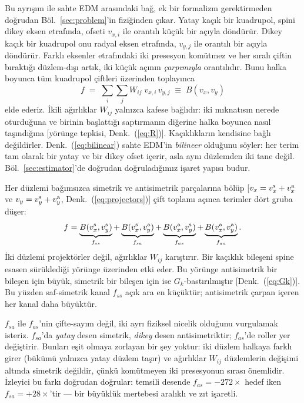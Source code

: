\documentclass[aps,prab,reprint,superscriptaddress,nofootinbib]{revtex4-2}
\begin{document}
Bu ayrışım ile sahte EDM arasındaki bağ, ek bir formalizm gerektirmeden doğrudan
Böl.~\ref{sec:problem}'in fiziğinden çıkar. Yatay kaçık bir kuadrupol, spini dikey
eksen etrafında, ofseti $v_{x,i}$ ile orantılı küçük bir açıyla döndürür. Dikey
kaçık bir kuadrupol onu radyal eksen etrafında, $v_{y,j}$ ile orantılı bir açıyla
döndürür. Farklı eksenler etrafındaki iki presesyon komütmez ve her sıralı çiftin
bıraktığı düzlem-dışı artık, iki küçük açının \emph{çarpımıyla} orantılıdır. Bunu
halka boyunca tüm kuadrupol çiftleri üzerinden toplayınca
\begin{equation}
  f \;=\; \sum_{i}\sum_{j} W_{ij}\; v_{x,i}\, v_{y,j}
  \;\equiv\; B(v_x, v_y)
  \label{eq:bilinear}
\end{equation}
elde ederiz. İkili ağırlıklar $W_{ij}$ yalnızca kafese bağlıdır: iki mıknatısın
nerede oturduğuna ve birinin başlattığı saptırmanın diğerine halka boyunca nasıl
taşındığına [yörünge tepkisi, Denk.~(\ref{eq:R})]. Kaçıklıkların kendisine
bağlı değildirler. Denk.~(\ref{eq:bilinear}) sahte EDM'in \emph{bilineer} olduğunu
söyler: her terim tam olarak bir yatay ve bir dikey ofset içerir, asla aynı
düzlemden iki tane değil. Böl.~\ref{sec:estimator}'de doğrudan doğruladığımız işaret
yapısı budur.

Her düzlemi bağımsızca simetrik ve antisimetrik parçalarına bölüp
[$v_x = v_x^{\rm s} + v_x^{\rm a}$ ve $v_y = v_y^{\rm s} + v_y^{\rm a}$,
Denk.~(\ref{eq:projectors})] çift toplamı açınca terimler dört gruba düşer:
\begin{equation}
  f = \underbrace{B(v_x^{\rm s},v_y^{\rm s})}_{f_{ss}}
    + \underbrace{B(v_x^{\rm s},v_y^{\rm a})}_{f_{sa}}
    + \underbrace{B(v_x^{\rm a},v_y^{\rm s})}_{f_{as}}
    + \underbrace{B(v_x^{\rm a},v_y^{\rm a})}_{f_{aa}} .
  \label{eq:channels}
\end{equation}
İki düzlemi projektörler değil, ağırlıklar $W_{ij}$ karıştırır. Bir kaçıklık
bileşeni spine esasen sürüklediği yörünge üzerinden etki eder. Bu yörünge
antisimetrik bir bileşen için büyük, simetrik bir bileşen için ise
$G_k$-bastırılmıştır [Denk.~(\ref{eq:Gk})]. Bu yüzden saf-simetrik kanal $f_{ss}$
açık ara en küçüktür; antisimetrik çarpan içeren her kanal daha büyüktür.

$f_{sa}$ ile $f_{as}$'nin çifte-sayım değil, iki ayrı fiziksel nicelik olduğunu
vurgulamak isteriz. $f_{sa}$'da \emph{yatay} desen simetrik, \emph{dikey} desen
antisimetriktir; $f_{as}$'de roller yer değiştirir. Bunları eşit olmaya zorlayan
bir şey yoktur: iki düzlem halkaya farklı girer (bükümü yalnızca yatay düzlem
taşır) ve ağırlıklar $W_{ij}$ düzlemlerin değişimi altında simetrik değildir, çünkü
komütmeyen iki presesyonun sırası önemlidir. İzleyici bu farkı doğrudan doğrular:
temsili desende $f_{as} = -272\times$ hedef iken $f_{sa} = +28\times$'tir --- bir
büyüklük mertebesi aralıklı ve zıt işaretli.
\end{document}
